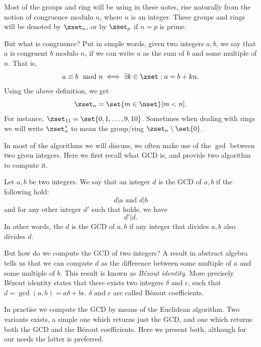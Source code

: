 \documentclass{subfiles}
\begin{document}
    Most of the groups and ring will be using in these notes,
        rise naturally from the notion of congruence modulo \(n\),
        where \(n\) is an integer. These groups and rings will be denoted by \(\zset_{n}\),
        or by \(\zset_{p}\) if \(n = p\) is prime.

    But what is congruence? Put in simple words, given two integers \(a, b\),
        we say that \(a \text{ is congruent } b\) modulo \(n\), 
        if we can write \(a\) as the sum of \(b\) and some multiple of \(n\).
        That is, 
        \[
            a \equiv b \mod n \iff \exists k \in \zset : a = b + kn.
        \]
        Using the above definition, we get
        \[
            \zset_{n} = \set{m \in \nset}[m < n].
        \]
        For instance, \(\zset_{11} = \set{0, 1, \ldots, 9, 10}\).
        Sometimes when dealing with rings we will write \(\zset_{n}^{*}\) to mean the group/ring
        \(\zset_{n} \setminus \set{0}\).

    In most of the algorithms we will discuss,
        we often make use of the \(\gcd\) between two given integers.
        Here we first recall what GCD is, and provide two algorithm to compute it.

    Let \(a, b\) be two integers.
        We say that an integer \(d\) is the GCD of \(a, b\) if the following hold:
        \begin{equation}\label{eq:gcd-definition}
            d \vert a \text{ and } d \vert b 
        \end{equation}
        and for any other integer \(d'\) such that  holds,
        we have
        \[
            d' \vert d.
        \]
        In other words, the \(d\) is the GCD of \(a, b\) if any integer that divides \(a, b\)
        also divides \(d\).

    But how do we compute the GCD of two integers? A result in abstract algebra tells us
        that we can compute \(d\) as the difference between some multiple of \(a\)
        and some multiple of \(b\). This result is known as \emph{Bézout identity}.
        More precisely Bézout identity states that there exists two integers \(\delta \text{ and } \epsilon\),
        such that \(d = \gcd(a, b) = a\delta + b\epsilon\).
        \(\delta \text{ and } \epsilon\) are called Bézout coefficients.

    In practise we compute the GCD by means of the Euclidean algorithm.
        Two variants exists, a simple one which returns just the GCD,
        and one which returns both the GCD and the Bézout coefficients.
        Here we present both, although for our needs the latter is preferred.

        
        
\end{document}
